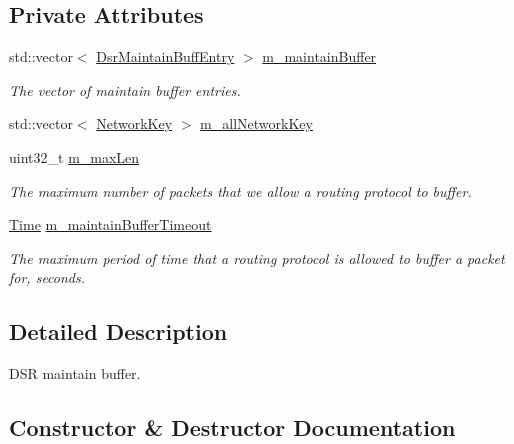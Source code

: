 \subsection*{Private Attributes}
\begin{DoxyCompactItemize}
\item 
std\+::vector$<$ \hyperlink{classns3_1_1dsr_1_1DsrMaintainBuffEntry}{Dsr\+Maintain\+Buff\+Entry} $>$ \hyperlink{classns3_1_1dsr_1_1DsrMaintainBuffer_a942fc86793c5a6f538a9f0bd69709ce9}{m\+\_\+maintain\+Buffer}
\begin{DoxyCompactList}\small\item\em The vector of maintain buffer entries. \end{DoxyCompactList}\item 
std\+::vector$<$ \hyperlink{structns3_1_1dsr_1_1NetworkKey}{Network\+Key} $>$ \hyperlink{classns3_1_1dsr_1_1DsrMaintainBuffer_a3ba935c313adf894d20e612dbab825a3}{m\+\_\+all\+Network\+Key}
\item 
uint32\+\_\+t \hyperlink{classns3_1_1dsr_1_1DsrMaintainBuffer_a497cea8ef3a7d5ee9db88e8cc0b8a365}{m\+\_\+max\+Len}
\begin{DoxyCompactList}\small\item\em The maximum number of packets that we allow a routing protocol to buffer. \end{DoxyCompactList}\item 
\hyperlink{classns3_1_1Time}{Time} \hyperlink{classns3_1_1dsr_1_1DsrMaintainBuffer_a054cbdee77cd0a61520726c2fc72912c}{m\+\_\+maintain\+Buffer\+Timeout}
\begin{DoxyCompactList}\small\item\em The maximum period of time that a routing protocol is allowed to buffer a packet for, seconds. \end{DoxyCompactList}\end{DoxyCompactItemize}


\subsection{Detailed Description}
D\+SR maintain buffer. 

\subsection{Constructor \& Destructor Documentation}
